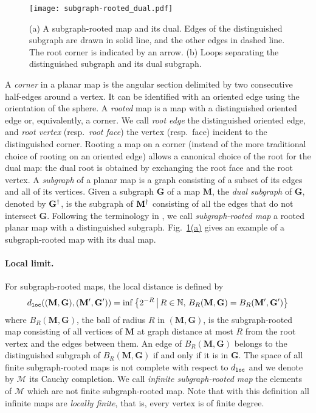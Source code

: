 \documentclass[a4paper]{article}
\newcommand{\refnote}[2]{\hyperref[#1]{\ref*{#1}#2}}
\newcommand*{\map}{\mathbf}
\newcommand*{\M}{\mathcal{M}}
\newcommand*{\m}{\map{M}}
\begin{document}
\begin{figure}[t]
\captionsetup{width=0.8\textwidth}
\begin{center}
\texttt{[image: subgraph-rooted\_dual.pdf]}
\caption{%
(a) A subgraph-rooted map and its dual.
Edges of the distinguished subgraph are drawn in solid line, and the other edges in dashed line. The root corner is indicated by an arrow.
(b) Loops separating the distinguished subgraph and its dual subgraph.
}
\label{fig:subgraph-rooted map}
\end{center}
\end{figure}

A \emph{corner} in a planar map is the angular section delimited by two consecutive half-edges around a vertex.
It can be identified with an oriented edge using the orientation of the sphere.
A \emph{rooted} map is a map with a distinguished oriented edge or, equivalently, a corner.
We call \emph{root edge} the distinguished oriented edge, and \emph{root vertex} (resp.\ \emph{root face}) the vertex (resp.\ face) incident to the distinguished corner.
Rooting a map on a corner (instead of the more traditional choice of rooting on an oriented edge) allows a canonical choice of the root for the dual map: the dual root is obtained by exchanging the root face and the root vertex.
A \emph{subgraph} of a planar map is a graph consisting of a subset of its edges and all of its vertices.
Given a subgraph $\map{G}$ of a map $\map{M}$, the \emph{dual subgraph} of $\map{G}$, denoted by $\map{G}^\dual$, is the subgraph of $\m^\dual$ consisting of all the edges that do not intersect $\map{G}$.
Following the terminology in \cite{Ber07}, we call \emph{subgraph-rooted map} a rooted planar map with a distinguished subgraph.
Fig.~\refnote{fig:subgraph-rooted map}{(a)} gives an example of a subgraph-rooted map with its dual map.


\paragraph{Local limit.} For subgraph-rooted maps, the local distance is defined by
\begin{equation}
	d\sub{loc}(\map{(M,G),(M',G')}) = 
	\inf\set{2^{-R}}{R\in\natural,\, B_R(\map{M,G})=B_R(\map{M',G'})}
\end{equation}
where $B_R(\map{M,G})$, the ball of radius $R$ in $(\map{M,G})$, is the subgraph-rooted map consisting of all vertices of $\map{M}$ at graph distance at most $R$ from the root vertex and the edges between them.
An edge of $B_R(\map{M,G})$ belongs to the distinguished subgraph of $B_R(\map{M,G})$ if and only if it is in $\map{G}$.
The space of all finite subgraph-rooted maps is not complete with respect to $d_{\mathtt{loc}}$ and we denote by $\M$ its Cauchy completion.
We call \emph{infinite subgraph-rooted map} the elements of $\M$ which are not finite subgraph-rooted map.
Note that with this definition all infinite maps are \emph{locally finite}, that is, every vertex is of finite degree.
\end{document}
